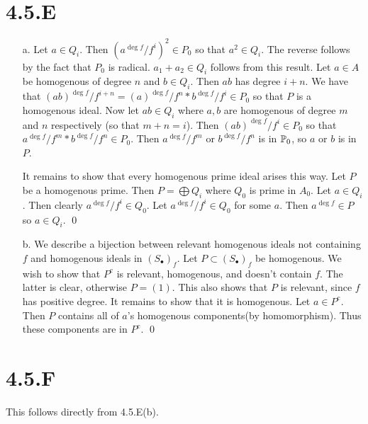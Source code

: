 \documentclass{article}
\begin{document}
\section{4.5.E}
\begin{itemize}
      \item[a.]
            Let $a \in Q_i$. Then $(a^{\deg f}/f^i)^2 \in P_0$ so that
            $a^2 \in Q_i$. The reverse follows by the fact that
            $P_0$ is radical. $a_1+a_2 \in Q_i$ follows from this
            result. Let $a \in A$ be homogenous of degree
            $n$ and $b \in Q_i$. Then $ab$
            has degree $i+n$. We have that $(ab)^{\deg f}/f^{i+n}=(a)^{\deg f}/f^{n}*b^{\deg
                  f}/f^{i} \in P_0$ so that
            $P$ is a homogenous ideal. Now let $ab \in Q_i$
            where $a, b$ are homogenous of degree $m$
            and $n$ respectively (so that $m+n=i$). Then
            $(ab)^{\deg f}/f^{i} \in P_0$ so that $a^{\deg f}/f^{m}*b^{\deg f}/f^{n} \in P_0$. Then
            $a^{\deg f}/f^{m}$ or $b^{\deg f}/f^{n}$ is in $\P_0$,
            so $a$ or $b$ is in
            $P$.

            It remains to show that every homogenous prime ideal arises this way. Let
            $P$ be a homogenous prime. Then $P=\bigoplus Q_i$ where
            $Q_0$ is prime in $A_0$. Let
            $a \in Q_i$. Then clearly $a^{\deg f}/f^{i} \in Q_0$. Let
            $a^{\deg f}/f^{i} \in Q_0$ for some $a$. Then
            $a^{\deg f} \in P$ so $a \in Q_i$. \qed

      \item[b.] We describe a bijection between relevant homogenous ideals not containing
            $f$ and homogenous ideals in $(S_{\bullet})_f$. Let
            $P \subset (S_{\bullet})_f$ be homogenous. We wish to show that
            $P^{\text{c}}$ is relevant, homogenous, and doesn't contain
            $f$. The latter is clear, otherwise $P=(1)$.
            This also shows that $P$ is relevant, since
            $f$ has positive degree. It remains to show that it is
            homogenous. Let $a \in P^{\text{c}}$. Then $P$ contains
            all of $a$'s homogenous components(by homomorphism). Thus
            these components are in $P^{\text{c}}$. \qed
\end{itemize}

\section{4.5.F}
This follows directly from 4.5.E(b).
\end{document}
